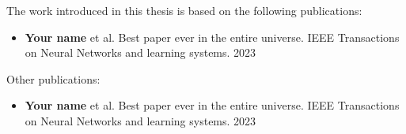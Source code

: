 

The work introduced in this thesis is based on the following publications:

\begin{itemize} 

\item \textbf{Your name} et al. Best paper ever in the entire universe. IEEE Transactions on Neural Networks and learning systems. 2023



\end{itemize}

\noindent Other publications:

\begin{itemize} 

\item \textbf{Your name} et al. Best paper ever in the entire universe. IEEE Transactions on Neural Networks and learning systems. 2023


\end{itemize}